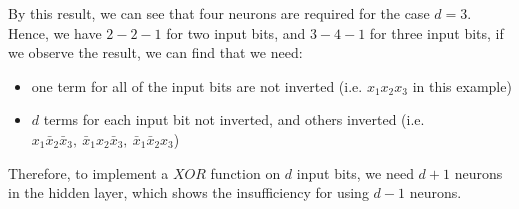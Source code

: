 \documentclass{article}
\begin{document}
By this result, we can see that four neurons are required for the case $d = 3$.
Hence, we have $2-2-1$ for two input bits, and $3-4-1$ for three input bits,
if we observe the result, we can find that we need:

\begin{itemize}
    \item one term for all of the input bits are not inverted (i.e. $x_1x_2x_3$ in this example)
    \item $d$ terms for each input bit not inverted, and others inverted (i.e. $x_1\bar{x}_2\bar{x}_3, \ \bar{x}_1x_2\bar{x}_3, \ \bar{x}_1\bar{x}_2x_3$)
\end{itemize} 

Therefore, to implement a $XOR$ function on $d$ input bits,
we need $d + 1$ neurons in the hidden layer, which shows the insufficiency for using $d-1$ neurons.
\end{document}
